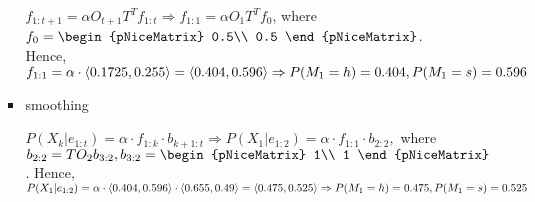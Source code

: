 \documentclass{homework}
\begin{document}
\begin{enumerate}
\begin{enumerate}
\begin{itemize}
		$f_{1:t+1} = \alpha O_{t+1}T^Tf_{1:t} \Rightarrow f_{1:1} = \alpha O_{1}T^Tf_{0}$,  where $f_{0} =
		\begin{pNiceMatrix}
		0.5\\
		0.5
		\end{pNiceMatrix}$.
		\newline Hence, $f_{1:1} = \alpha \cdot \langle0.1725, 0.255\rangle=\langle 0.404, 0.596\rangle \Rightarrow \newline P(M_1 = h) = 0.404, P(M_1 = s) = 0.596$
		\item smoothing

		$P(X_k|e_{1:t}) = \alpha \cdot f_{1:k}\cdot b_{k+1:t}\Rightarrow P(X_1|e_{1:2})=\alpha \cdot f_{1:1}\cdot b_{2:2},$ \newline where $b_{2:2} = TO_2b_{3:2}, b_{3:2} = 
		\begin{pNiceMatrix}
		1\\
		1
		\end{pNiceMatrix}$.\newline
	Hence, $P(X_1|e_{1:2}) = \alpha \cdot \langle 0.404, 0.596\rangle \cdot \langle 0.655, 0.49\rangle = \langle 0.475, 0.525\rangle \Rightarrow \newline P(M_1 = h) = 0.475, P(M_1 = s) = 0.525$
	\end{itemize}
	\end{enumerate}
\end{enumerate}
\end{document}
